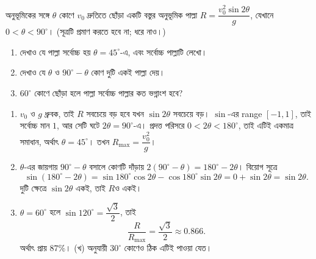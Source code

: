 \documentclass[11pt]{article}
\begin{document}
 অনুভূমিকের সঙ্গে $\theta$ কোণে $v_0$ দ্রুতিতে ছোঁড়া একটি বস্তুর
অনুভূমিক পাল্লা $R = \dfrac{v_0^2 \sin 2\theta}{g}$, যেখানে
$0 < \theta < 90^\circ$। (সূত্রটি প্রমাণ করতে হবে না; ধরে নাও।)
\begin{enumerate}
  \item দেখাও যে পাল্লা সর্বোচ্চ হয় $\theta = 45^\circ$-এ, এবং সর্বোচ্চ
        পাল্লাটি লেখো।
  \item দেখাও যে $\theta$ ও $90^\circ - \theta$ কোণ দুটি একই পাল্লা দেয়।
  \item $60^\circ$ কোণে ছোঁড়া হলে পাল্লা সর্বোচ্চ পাল্লার কত ভগ্নাংশ হবে?
\end{enumerate}

\begin{sol}
\begin{enumerate}
  \item $v_0$ ও $g$ ধ্রুবক, তাই $R$ সবচেয়ে বড় হবে যখন $\sin 2\theta$ সবচেয়ে
        বড়। $\sin$-এর range $[-1,1]$, তাই সর্বোচ্চ মান $1$, আর সেটি ঘটে
        $2\theta = 90^\circ$-এ। প্রদত্ত পরিসরে $0 < 2\theta < 180^\circ$, তাই
        এটিই একমাত্র সমাধান, অর্থাৎ $\theta = 45^\circ$। তখন
        $R_{\max} = \dfrac{v_0^2}{g}$।
  \item $\theta$-এর জায়গায় $90^\circ - \theta$ বসালে কোণটি দাঁড়ায়
        $2(90^\circ - \theta) = 180^\circ - 2\theta$। বিয়োগ সূত্রে
        \[
          \sin(180^\circ - 2\theta)
          = \sin 180^\circ \cos 2\theta - \cos 180^\circ \sin 2\theta
          = 0 + \sin 2\theta = \sin 2\theta .
        \]
        দুটি ক্ষেত্রে $\sin 2\theta$ একই, তাই $R$ও একই।
  \item $\theta = 60^\circ$ হলে $\sin 120^\circ = \dfrac{\sqrt{3}}{2}$, তাই
        \[
          \frac{R}{R_{\max}} = \frac{\sqrt{3}}{2} \approx 0.866 .
        \]
        অর্থাৎ প্রায় $87\%$। (খ) অনুযায়ী $30^\circ$ কোণেও ঠিক এটিই পাওয়া যেত।
\end{enumerate}
\end{sol}
\end{document}

